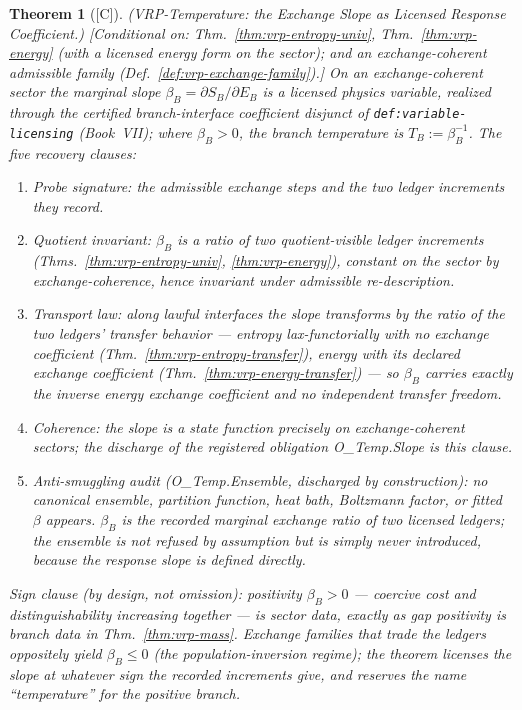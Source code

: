 \documentclass[12pt,oneside]{amsbook}
\theoremstyle{plain}
\newtheorem{theorem}{Theorem}[section]
\theoremstyle{definition}
\theoremstyle{remark}
\newcommand{\status}[1]{\textup{[#1]}}
\begin{document}
\begin{theorem}[\status{C}]\label{thm:vrp-temperature}
\textup{(VRP-Temperature: the Exchange Slope as Licensed Response
Coefficient.)}
\textup{[Conditional on: Thm.~\ref{thm:vrp-entropy-univ},
Thm.~\ref{thm:vrp-energy} (with a licensed energy form on the
sector); and an exchange-coherent admissible family
(Def.~\ref{def:vrp-exchange-family}).]}
On an exchange-coherent sector the marginal slope $\beta_B =
\partial S_B / \partial E_B$ is a licensed physics variable,
realized through the \emph{certified branch-interface coefficient}
disjunct of \texttt{def:variable-licensing} (Book~VII); where
$\beta_B > 0$, the \emph{branch temperature} is
$T_B := \beta_B^{-1}$.  The five recovery clauses:
\begin{enumerate}[label=\textup{(\arabic*)}]
  \item \emph{Probe signature:} the admissible exchange steps and
    the two ledger increments they record.
  \item \emph{Quotient invariant:} $\beta_B$ is a ratio of two
    quotient-visible ledger increments
    (Thms.~\ref{thm:vrp-entropy-univ}, \ref{thm:vrp-energy}),
    constant on the sector by exchange-coherence, hence invariant
    under admissible re-description.
  \item \emph{Transport law:} along lawful interfaces the slope
    transforms by the ratio of the two ledgers' transfer behavior
    --- entropy lax-functorially with no exchange coefficient
    (Thm.~\ref{thm:vrp-entropy-transfer}), energy with its
    declared exchange coefficient
    (Thm.~\ref{thm:vrp-energy-transfer}) --- so $\beta_B$ carries
    exactly the inverse energy exchange coefficient and no
    independent transfer freedom.
  \item \emph{Coherence:} the slope is a state function precisely
    on exchange-coherent sectors; the discharge of the registered
    obligation O\_Temp.Slope is this clause.
  \item \emph{Anti-smuggling audit (O\_Temp.Ensemble, discharged
    by construction):} no canonical ensemble, partition function,
    heat bath, Boltzmann factor, or fitted $\beta$ appears.
    $\beta_B$ is the recorded marginal exchange ratio of two
    licensed ledgers; the ensemble is not refused by assumption
    but is simply never introduced, because the response slope is
    defined directly.
\end{enumerate}
\emph{Sign clause (by design, not omission):} positivity
$\beta_B > 0$ --- coercive cost and distinguishability increasing
together --- is sector data, exactly as gap positivity is branch
data in Thm.~\ref{thm:vrp-mass}.  Exchange families that trade the
ledgers oppositely yield $\beta_B \le 0$ (the population-inversion
regime); the theorem licenses the slope at whatever sign the
recorded increments give, and reserves the name ``temperature''
for the positive branch.
\end{theorem}
\end{document}
